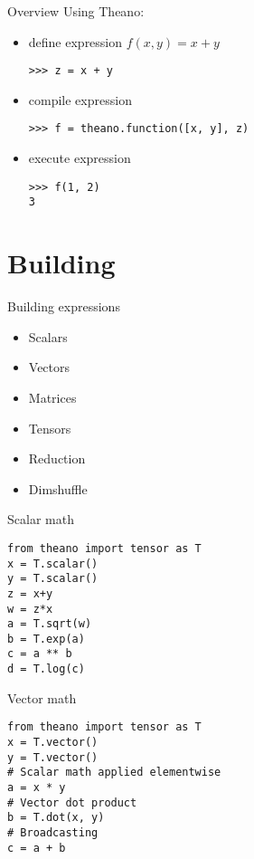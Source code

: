 \documentclass[utf8x,hyperref={pdfpagelabels=false}]{beamer}
\begin{document}
\begin{frame}[fragile]{Overview}
  Using Theano:
  \begin{itemize}
  \item define expression $f(x,y) = x + y$
\begin{lstlisting}
>>> z = x + y
\end{lstlisting}
  \item compile expression
\begin{lstlisting}
>>> f = theano.function([x, y], z)
\end{lstlisting}
  \item execute expression
\begin{lstlisting}
>>> f(1, 2)
3
\end{lstlisting}
  \end{itemize}
\end{frame}

\section{Building}

\begin{frame}{Building expressions}
  \begin{itemize}
  \item Scalars
  \item Vectors
  \item Matrices
  \item Tensors
  \item Reduction
  \item Dimshuffle
  \end{itemize}
\end{frame}

\begin{frame}[fragile]{Scalar math}
\begin{lstlisting}
from theano import tensor as T
x = T.scalar()
y = T.scalar()
z = x+y
w = z*x
a = T.sqrt(w)
b = T.exp(a)
c = a ** b
d = T.log(c)
\end{lstlisting}
\end{frame}

\begin{frame}[fragile]{Vector math}
\begin{lstlisting}
from theano import tensor as T
x = T.vector()
y = T.vector()
# Scalar math applied elementwise
a = x * y
# Vector dot product
b = T.dot(x, y)
# Broadcasting
c = a + b
\end{lstlisting}
\end{frame}
\end{document}
